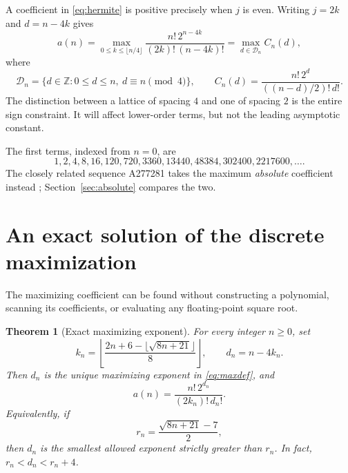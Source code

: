 \documentclass[11pt,letterpaper]{article}
\newtheorem{theorem}{Theorem}[section]
\theoremstyle{remark}
\newcommand{\ZZ}{\mathbb{Z}}
\begin{document}
A coefficient in \eqref{eq:hermite} is positive precisely when $j$ is even.
Writing $j=2k$ and $d=n-4k$ gives
\begin{equation}\label{eq:maxdef}
 a(n)=\max_{0\le k\le\lfloor n/4\rfloor}
 \frac{n!\,2^{n-4k}}{(2k)!\,(n-4k)!}
 =\max_{d\in\mathcal D_n} C_n(d),
\end{equation}
where
\begin{equation}\label{eq:lattice}
 \mathcal D_n=\{d\in\ZZ:0\le d\le n,\ d\equiv n\pmod4\},
 \qquad
 C_n(d)=\frac{n!\,2^d}{((n-d)/2)!\,d!}.
\end{equation}
The distinction between a lattice of spacing $4$ and one of spacing $2$
is the entire sign constraint. It will affect lower-order terms, but not
the leading asymptotic constant.

The first terms, indexed from $n=0$, are
\[
 1,2,4,8,16,120,720,3360,13440,48384,302400,2217600,\ldots.
\]
The closely related sequence A277281 takes the maximum \emph{absolute}
coefficient instead \cite{oeis281}; Section~\ref{sec:absolute} compares the two.

\section{An exact solution of the discrete maximization}\label{sec:exact}

The maximizing coefficient can be found without constructing a polynomial,
scanning its coefficients, or evaluating any floating-point square root.

\begin{theorem}[Exact maximizing exponent]\label{thm:exact}
For every integer $n\ge0$, set
\begin{equation}\label{eq:kexact}
 k_n=\left\lfloor
 \frac{2n+6-\lfloor\sqrt{8n+21}\rfloor}{8}
 \right\rfloor,
 \qquad d_n=n-4k_n.
\end{equation}
Then $d_n$ is the unique maximizing exponent in \eqref{eq:maxdef}, and
\begin{equation}\label{eq:aexact}
 \boxed{\displaystyle
 a(n)=\frac{n!\,2^{d_n}}{(2k_n)!\,d_n!}.}
\end{equation}
Equivalently, if
\begin{equation}\label{eq:threshold}
 r_n=\frac{\sqrt{8n+21}-7}{2},
\end{equation}
then $d_n$ is the smallest allowed exponent strictly greater than $r_n$.
In fact, $r_n<d_n<r_n+4$.
\end{theorem}
\end{document}
